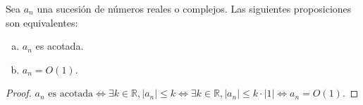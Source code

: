 \documentclass[
	spanish,
	8pt,
	utf8,
	xcolor=table,
	handout,
	aspectratio=169,
	professionalfonts,
	mathserif,
	leqno,
]{beamer}
\begin{document}
\begin{frame}
	\begin{theorem}
		Sea $a_{n}$ una sucesión de números reales o complejos.
		Las siguientes proposiciones son equivalentes:
		\begin{multicols}{2}
			\begin{enumerate}[a)]
				\item

				      $a_{n}$ es acotada.

				\item

				      $a_{n}=O\left(1\right)$.
			\end{enumerate}
		\end{multicols}
	\end{theorem}

	\begin{proof}
		\begin{math}
			a_{n}\text{ es acotada}
			\iff\exists k\in\mathbb{R},
			\left|a_{n}\right|\leq k
			\iff\exists k\in\mathbb{R},
			\left|a_{n}\right|\leq
			k\cdot
			\left|1\right|
			\iff a_{n}=
			O\left(1\right).
		\end{math}
	\end{proof}
\end{frame}
\end{document}
